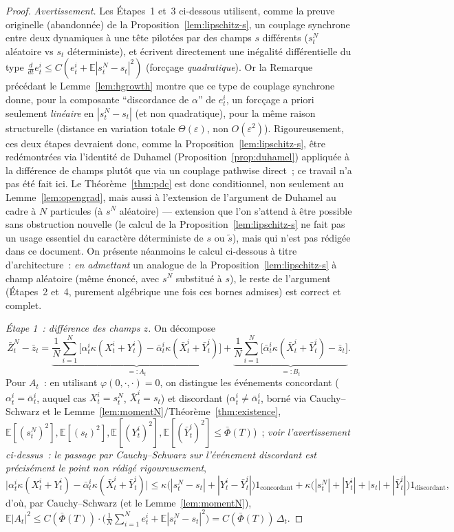 \documentclass[11pt,a4paper]{article}
\newcommand{\ind}[1]{\mathrm{1}_{#1}}
\newcommand{\E}{\mathbb{E}}
\theoremstyle{plain}
\theoremstyle{definition}
\begin{document}
\begin{proof}
\emph{Avertissement.} Les \'Etapes~1 et~3 ci-dessous utilisent, comme la preuve originelle (abandonn\'ee) de la Proposition~\ref{lem:lipschitz-s}, un couplage synchrone entre deux dynamiques \`a une t\^ete pilot\'ees par des champs $s$ diff\'erents ($s^N_t$ al\'eatoire vs $s_t$ d\'eterministe), et \'ecrivent directement une in\'egalit\'e diff\'erentielle du type $\frac{d}{dt}e_t^i\le C(e_t^i+\E|s_t^N-s_t|^2)$ (forc\c cage \emph{quadratique}). Or la Remarque pr\'ec\'edant le Lemme~\ref{lem:hgrowth} montre que ce type de couplage synchrone donne, pour la composante ``discordance de $\alpha$'' de $e_t^i$, un forc\c cage a priori seulement \emph{lin\'eaire} en $|s_t^N-s_t|$ (et non quadratique), pour la m\^eme raison structurelle (distance en variation totale $\Theta(\varepsilon)$, non $O(\varepsilon^2)$). Rigoureusement, ces deux \'etapes devraient donc, comme la Proposition~\ref{lem:lipschitz-s}, \^etre red\'emontr\'ees via l'identit\'e de Duhamel (Proposition~\ref{prop:duhamel}) appliqu\'ee \`a la diff\'erence de champs plut\^ot que via un couplage pathwise direct~; ce travail n'a pas \'et\'e fait ici. Le Th\'eor\`eme~\ref{thm:pdc} est donc conditionnel, non seulement au Lemme~\ref{lem:opengrad}, mais aussi \`a l'extension de l'argument de Duhamel au cadre \`a $N$ particules (\`a $s^N$ al\'eatoire) --- extension que l'on s'attend \`a \^etre possible sans obstruction nouvelle (le calcul de la Proposition~\ref{lem:lipschitz-s} ne fait pas un usage essentiel du caract\`ere d\'eterministe de $s$ ou $\tilde s$), mais qui n'est pas r\'edig\'ee dans ce document. On pr\'esente n\'eanmoins le calcul ci-dessous \`a titre d'architecture~: \emph{en admettant} un analogue de la Proposition~\ref{lem:lipschitz-s} \`a champ al\'eatoire (m\^eme \'enonc\'e, avec $s^N$ substitu\'e \`a $s$), le reste de l'argument (\'Etapes~2 et~4, purement alg\'ebrique une fois ces bornes admises) est correct et complet.

\emph{\'Etape 1~: diff\'erence des champs $z$.} On d\'ecompose
\[
\bar Z_t^N-\bar z_t = \underbrace{\frac1N\sum_{i=1}^N\Big[\alpha_t^i\kappa(X_t^i+Y_t^i) - \bar\alpha_t^i\kappa(\bar X_t^i+\bar Y_t^i)\Big]}_{=:A_t} + \underbrace{\frac1N\sum_{i=1}^N\Big[\bar\alpha_t^i\kappa(\bar X_t^i+\bar Y_t^i) - \bar z_t\Big]}_{=:B_t}.
\]
Pour $A_t$~: en utilisant $\varphi(0,\cdot,\cdot)=0$, on distingue les \'ev\'enements concordant ($\alpha_t^i=\bar\alpha_t^i$, auquel cas $X_t^i=s_t^N$, $\bar X_t^i=s_t$) et discordant ($\alpha_t^i\ne\bar\alpha_t^i$, born\'e via Cauchy--Schwarz et le Lemme~\ref{lem:momentN}/Th\'eor\`eme~\ref{thm:existence}, $\E[(s_t^N)^2],\E[(s_t)^2],\E[(Y_t^i)^2],\E[(\bar Y_t^i)^2]\le\bar\Phi(T)$)~; \emph{voir l'avertissement ci-dessus~: le passage par Cauchy--Schwarz sur l'\'ev\'enement discordant est pr\'ecis\'ement le point non r\'edig\'e rigoureusement},
\[
\big|\alpha_t^i\kappa(X_t^i+Y_t^i)-\bar\alpha_t^i\kappa(\bar X_t^i+\bar Y_t^i)\big| \le \kappa\big(|s_t^N-s_t|+|Y_t^i-\bar Y_t^i|\big)\ind{\text{concordant}}+ \kappa\big(|s_t^N|+|Y_t^i|+|s_t|+|\bar Y_t^i|\big)\ind{\text{discordant}},
\]
d'o\`u, par Cauchy--Schwarz (et le Lemme~\ref{lem:momentN}), $\E|A_t|^2 \le C(\bar\Phi(T))\cdot\Big(\frac1N\sum_{i=1}^N e_t^i + \E|s_t^N-s_t|^2\Big) = C(\bar\Phi(T))\,\Delta_t$.


\end{proof}
\end{document}
